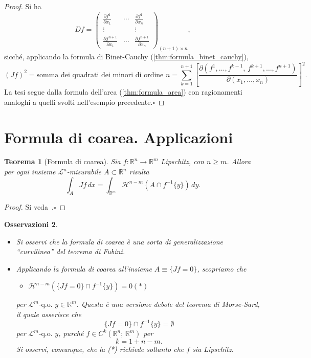 \documentclass[a4paper,10pt,openright,oneside]{book}
\theoremstyle{theoremstyle}
\newtheorem{teorema}{Teorema}[section]
\theoremstyle{theoremstylewoheader}
\theoremstyle{theoremstyle}
\newtheorem{osservazioni}[teorema]{Osservazioni}
\theoremstyle{proofsecstyle}
\theoremstyle{nonumberplain}
\newtheorem{proof}{Dim.}
\newcommand{\RR}{\ensuremath{\mathbb{R}}}
\newcommand{\Leb}{\ensuremath{\mathcal{L}}}
\newcommand{\Haus}{\ensuremath{\mathcal{H}}}
\newcommand{\qogni}[2]{\ensuremath{#2\text{-q.o. $\!#1$}}}
\renewcommand{\qedsymbol}{\ensuremath{\square}}
\newcommand{\qed}{\unskip\nobreak\hfill\nobreak\hspace{.5em}\qedsymbol}
\newcommand{\mymath}[2]{\begin{itemize}%
  \item[]\hfill\hbox{}\ensuremath{\displaystyle #1}\hfill\ensuremath{\displaystyle #2}%
  \end{itemize}}
\begin{document}
\begin{proof}
Si ha
\[
Df = \left(\begin{array}{ccc}
\displaystyle\frac{\partial f^1}{\partial x_1} & \cdots & \displaystyle\frac{\partial f^1}{\partial x_n}\\
\vdots & & \vdots\\
\displaystyle\frac{\partial f^{n+1}}{\partial x_1} & \cdots & \displaystyle\frac{\partial f^{n+1}}{\partial x_n}
\end{array}\right)_{(n+1) \times n},
\]
sicché, applicando la formula di Binet-Cauchy (\ref{thm:formula_binet_cauchy}),
\[
(Jf)^ 2 = \text{somma dei quadrati dei minori di ordine $n$} = \sum_{k=1}^{n+1} \left[\frac{\partial(f^1, \ldots, f^{k-1},\, f^{k+1}, \ldots, f^{n+1})}{\partial (x_1, \ldots, x_n)}\right]^2.
\]
La tesi segue dalla formula dell'area (\ref{thm:formula_area}) con ragionamenti analoghi a quelli svolti nell'esempio precedente.\qed 
\end{proof}

\section{Formula di coarea. Applicazioni}

\begin{teorema}[Formula di coarea]
\label{thm:formula_coarea}
Sia $f : \RR^n \rightarrow \RR^m$ Lipschitz, con $n \ge m$. Allora per ogni insieme $\Leb^n$-misurabile $A \subset \RR^n$ risulta
\[
\int_A Jf\, dx = \int_{\RR^m} \Haus^{n-m}(A \cap f^{-1}\{y\})\, dy.
\]
\end{teorema}

\begin{proof}
Si veda~\cite[Theorem~1, Section~3.4.2, pag.~112]{evans}.\qed 
\end{proof}

\begin{osservazioni}
\mbox{}
\begin{itemize}
\item[(i)] Si osservi che la formula di coarea è una sorta di generalizzazione ``curvilinea'' del teorema di Fubini.
\item[(ii)] Applicando la formula di coarea all'insieme $A \equiv \{Jf = 0\}$, scopriamo che \mymath{\Haus^{n-m}(\{Jf = 0\} \cap f^{-1}\{y\}) = 0}{(*)} per $\qogni{y \in \RR^m}{\Leb^m}$. Questa è una versione debole del \emph{teorema di Morse-Sard}, il quale asserisce che
\[
\{Jf = 0\} \cap f^{-1}\{y\} = \emptyset
\]
per $\qogni{y}{\Leb^m}$, purché $f \in C^k(\RR^n;\, \RR^m)$ per
\[
k = 1 + n - m.
\]
Si osservi, comunque, che la (*) richiede soltanto che $f$ sia Lipschitz.
\end{itemize}
\end{osservazioni}
\end{document}
